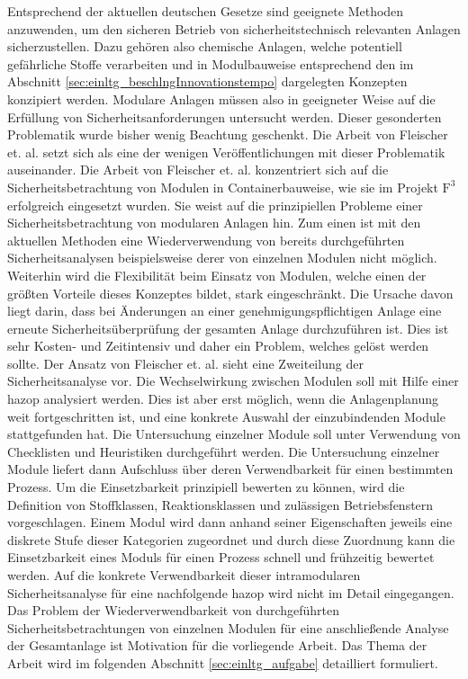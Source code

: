 Entsprechend der aktuellen deutschen Gesetze sind geeignete Methoden anzuwenden, um den sicheren Betrieb von sicherheitstechnisch relevanten Anlagen sicherzustellen. Dazu geh\"oren also chemische Anlagen, welche potentiell gef\"ahrliche Stoffe verarbeiten und in Modulbauweise entsprechend den im Abschnitt \ref{sec:einltg_beschlngInnovationstempo} dargelegten Konzepten konzipiert werden. Modulare Anlagen m\"ussen also in geeigneter Weise auf die Erf\"ullung von Sicherheitsanforderungen untersucht werden. Dieser gesonderten Problematik wurde bisher wenig Beachtung geschenkt. Die Arbeit von Fleischer et. al. \cite{Fleischer_2015} setzt sich als eine der wenigen Ver\"offentlichungen mit dieser Problematik auseinander. Die Arbeit von Fleischer et. al. konzentriert sich auf die Sicherheitsbetrachtung von Modulen in Containerbauweise, wie sie im Projekt $\text{F}^{3}$ erfolgreich eingesetzt wurden. Sie weist auf die prinzipiellen Probleme einer Sicherheitsbetrachtung von modularen Anlagen hin. Zum einen ist mit den aktuellen Methoden eine Wiederverwendung von bereits durchgef\"uhrten Sicherheitsanalysen beispielsweise derer von einzelnen Modulen nicht m\"oglich. Weiterhin wird die Flexibilit\"at beim Einsatz von Modulen, welche einen der gr\"o\ss{}ten Vorteile dieses Konzeptes bildet, stark eingeschr\"ankt. Die Ursache davon liegt darin, dass bei \"Anderungen an einer genehmigungspflichtigen Anlage eine erneute Sicherheits\"uberpr\"ufung der gesamten Anlage durchzuf\"uhren ist. Dies ist sehr Kosten- und Zeitintensiv und daher ein Problem, welches gel\"ost werden sollte. \hfill \newline
Der Ansatz von Fleischer et. al. sieht eine Zweiteilung der Sicherheitsanalyse vor. Die Wechselwirkung zwischen Modulen soll mit Hilfe einer \ac{hazop} analysiert werden. Dies ist aber erst m\"oglich, wenn die Anlagenplanung weit fortgeschritten ist, und eine konkrete Auswahl der einzubindenden Module stattgefunden hat. Die Untersuchung einzelner Module soll unter Verwendung von Checklisten und Heuristiken durchgef\"uhrt werden. Die Untersuchung einzelner Module liefert dann Aufschluss \"uber deren Verwendbarkeit f\"ur einen bestimmten Prozess. Um die Einsetzbarkeit prinzipiell bewerten zu k\"onnen, wird die Definition von Stoffklassen, Reaktionsklassen und zul\"assigen Betriebsfenstern vorgeschlagen. Einem Modul wird dann anhand seiner Eigenschaften jeweils eine diskrete Stufe dieser Kategorien zugeordnet und durch diese Zuordnung kann die Einsetzbarkeit eines Moduls f\"ur einen Prozess schnell und fr\"uhzeitig bewertet werden. Auf die konkrete Verwendbarkeit dieser intramodularen Sicherheitsanalyse f\"ur eine nachfolgende \ac{hazop} wird nicht im Detail eingegangen. Das Problem der Wiederverwendbarkeit von durchgef\"uhrten Sicherheitsbetrachtungen von einzelnen Modulen f\"ur eine anschlie\ss{}ende Analyse der Gesamtanlage ist Motivation f\"ur die vorliegende Arbeit. Das Thema der Arbeit wird im folgenden Abschnitt \ref{sec:einltg_aufgabe} detailliert formuliert.

